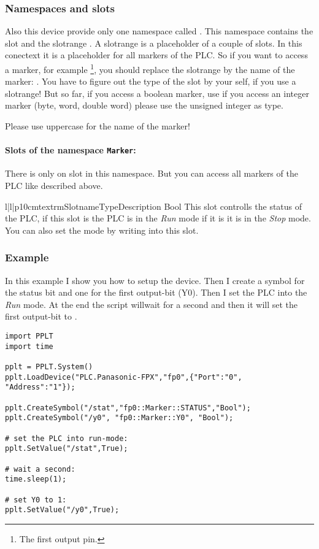 \subsubsection{Namespaces and slots}
Also this device provide only one namespace called . This 
namespace contains the slot  and the slotrange . A 
slotrange is a placeholder of a couple of slots. In this conectext it is a
placeholder for all markers of the PLC. So if you want to access a marker,
for example \footnote{The first output pin.}, you should replace
the slotrange by the name of the marker: . 
You have to figure out the type of the slot by your self, if you use
a slotrange! But so far, if you access a boolean marker, use 
if you access an integer marker (byte, word, double word) please use 
the unsigned integer  as type.
\begin{notice}
Please use uppercase for the name of the marker!
\end{notice}

\paragraph{Slots of the namespace \texttt{Marker}:}
There is only on slot in this namespace. But you can access all markers 
of the PLC like described above.
\begin{tableiii}{l|l|p{10cm}}{textrm}{Slotname}{Type}{Description}
        {Bool}
        {This slot controlls the status of the PLC, if this slot is 
         the PLC is in the \emph{Run} mode if it is
         it is in the \emph{Stop} mode. You can also
        set the mode by writing into this slot.}
\end{tableiii}

\subsubsection{Example}
In this example I show you how to setup the  
device. Then I create a symbol for the status bit and one for the first 
output-bit (Y0). Then I set the PLC into the \emph{Run} mode. At the end the
script willwait for a second and then it will set the first output-bit
to .

\begin{verbatim}
import PPLT
import time

pplt = PPLT.System()
pplt.LoadDevice("PLC.Panasonic-FPX","fp0",{"Port":"0", "Address":"1"});

pplt.CreateSymbol("/stat","fp0::Marker::STATUS","Bool");
pplt.CreateSymbol("/y0", "fp0::Marker::Y0", "Bool");

# set the PLC into run-mode:
pplt.SetValue("/stat",True);

# wait a second:
time.sleep(1);

# set Y0 to 1:
pplt.SetValue("/y0",True);
\end{verbatim}






